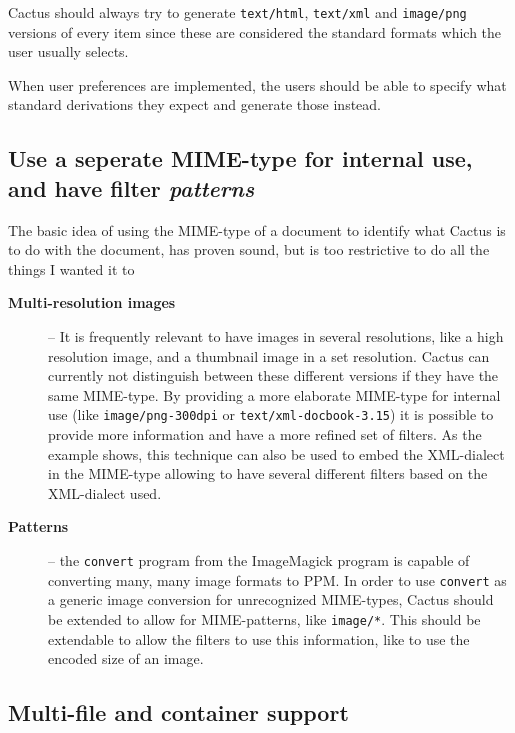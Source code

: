 Cactus should always try to generate \texttt{text/html},
\texttt{text/xml} and \texttt{image/png} versions of every item since
these are considered the standard formats which the user usually
selects.

When user preferences are implemented, the users should be able to
specify what standard derivations they expect and generate those
instead.

\subsection*{Use a seperate MIME-type for internal use, and have
  filter \textit{patterns}}

The basic idea of using the MIME-type of a document to identify what
Cactus is to do with the document, has proven sound, but is too
restrictive to do all the things I wanted it to

\begin{description}
\item[\textbf{Multi-resolution images}] -- It is frequently relevant
  to have images in several resolutions, like a high resolution image,
  and a thumbnail image in a set resolution.  Cactus can currently not
  distinguish between these different versions if they have the same
  MIME-type.  By providing a more elaborate MIME-type for internal use
  (like \texttt{image/png-300dpi} or
  \texttt{text/xml-docbook-3.15}) it is possible to provide more
  information and have a more refined set of filters.  As the example
  shows, this technique can also be used to embed the XML-dialect in
  the MIME-type allowing to have several different filters based on
  the XML-dialect used.

\item[\textbf{Patterns}] -- the \texttt{convert} program from the
ImageMagick program is capable of converting many, many image formats
to PPM.  In order to use \texttt{convert} as a generic image
conversion for unrecognized MIME-types, Cactus should be extended to
allow for MIME-patterns, like \texttt{image/*}.  This should be
extendable to allow the filters to use this information, like to use
the encoded size of an image.

\end{description}


\subsection*{Multi-file and container support}

